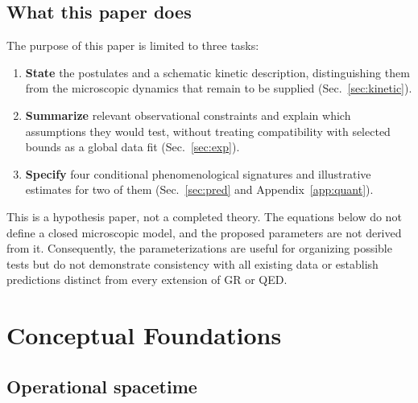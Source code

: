 \documentclass[11pt,a4paper]{article}
\begin{document}
\subsection{What this paper does}

The purpose of this paper is limited to three tasks:
\begin{enumerate}
\item \textbf{State} the postulates and a schematic kinetic description, distinguishing them from
the microscopic dynamics that remain to be supplied (Sec.~\ref{sec:kinetic}).
\item \textbf{Summarize} relevant observational constraints and explain which assumptions they
would test, without treating compatibility with selected bounds as a global data fit
(Sec.~\ref{sec:exp}).
\item \textbf{Specify} four conditional phenomenological signatures and illustrative estimates for
two of them (Sec.~\ref{sec:pred} and Appendix~\ref{app:quant}).
\end{enumerate}

This is a hypothesis paper, not a completed theory. The equations below do not define a closed
microscopic model, and the proposed parameters are not derived from it. Consequently, the
parameterizations are useful for organizing possible tests but do not demonstrate consistency with
all existing data or establish predictions distinct from every extension of GR or QED.

\section{Conceptual Foundations}\label{sec:concept}

\subsection{Operational spacetime}
\end{document}
